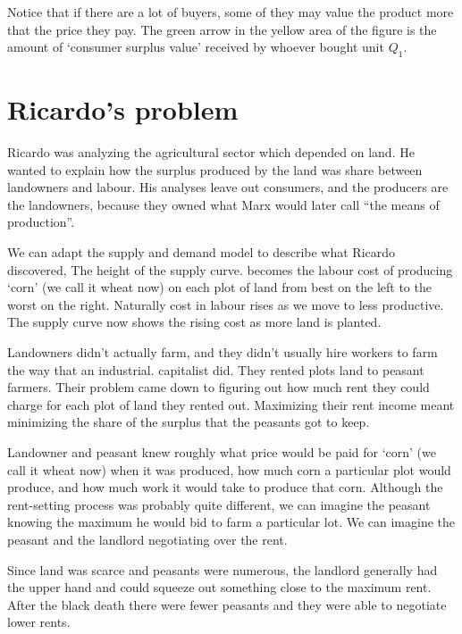 \documentclass[11pt]{amsart}
\begin{document}
Notice that if there are a lot of buyers, some of they may value the product more  that the price they pay. The green arrow in the yellow area of the figure is the amount of `consumer surplus value' received by whoever bought unit $Q_1$.


\section{Ricardo's problem}
Ricardo was analyzing the agricultural sector which depended on land. He wanted to explain how the surplus produced by the land was share between landowners and labour. His analyses leave out consumers, and the producers are the landowners, because they owned what Marx would later call ``the means of production''. 

We can adapt the supply and demand  model to describe what Ricardo discovered,  The height of the supply curve. becomes the labour cost of producing  `corn' (we call it wheat now) on each plot of land from best on the left to the worst on the right. Naturally cost in labour rises as we move to less productive. The supply curve now shows the rising cost as more land is planted.

Landowners didn't actually farm, and they didn't usually hire workers to  farm the way that an industrial. capitalist did. They  rented plots land to peasant farmers. Their problem came down to figuring out how much rent they could charge for each plot of land they rented out. Maximizing their rent  income meant minimizing the share of the surplus that the peasants got to keep. 

Landowner and peasant knew roughly what  price would be paid for `corn' (we call it wheat now) when it was produced, how much corn a particular plot would produce, and how much work it would take to produce that corn. Although the rent-setting process was probably quite different, we can imagine the peasant knowing the maximum he would bid to farm a particular lot.  We can imagine the peasant and the landlord negotiating over the rent. 

Since land was scarce and peasants were numerous, the landlord generally had the upper hand and could squeeze out something close to the maximum rent. After the black death there were fewer peasants  and they were able to negotiate lower rents.
\end{document}
